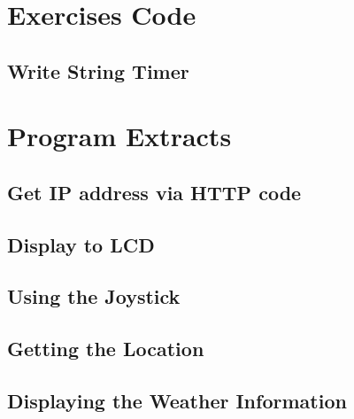 \begin{appendices}
	\label{Appendix:start}
	\section{Exercises Code}
	{
		\subsection{Write String Timer}
		{
		\label{appendix:write-string-timer}
		
		}
	}
	\section{Program Extracts}{
		\subsection{Get IP address via HTTP code}
		{
			\label{appendix:get-IP-Address-Via-HTTP}
			
		}
		\subsection{Display to LCD}
		{
			\label{appendix:display-to-LCD}
			
		}
		\subsection{Using the Joystick}
		{
			\label{appendix:use-joystick}
			
		}
		\subsection{Getting the Location}
		{
			\label{appendix:get-location}
			
		}
		\subsection{Displaying the Weather Information}
		{
			\label{appendix:display-weather-info}
			
		}
		
	}
\end{appendices}
